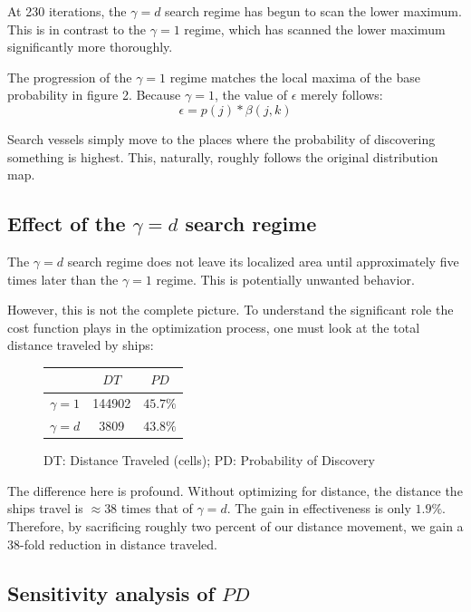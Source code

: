 \documentclass[a4paper]{article}
\begin{document}
At 230 iterations, the $\gamma=d$ search regime has begun to scan the lower maximum. This is in contrast to the $\gamma=1$ regime, which has scanned the lower maximum significantly more thoroughly.

The progression of the $\gamma=1$ regime matches the local maxima of the base probability in figure 2. Because $\gamma=1$, the value of $\epsilon$ merely follows: $$\epsilon = p(j)*\beta(j,k)$$

Search vessels simply move to the places where the probability of discovering something is highest. This, naturally, roughly follows the original distribution map.

\subsection{Effect of the $\gamma=d$ search regime}

The $\gamma=d$ search regime does not leave its localized area until approximately five times later than the $\gamma=1$ regime. This is potentially unwanted behavior. 

However, this is not the complete picture. To understand the significant role the cost function plays in the optimization process, one must look at the total distance traveled by ships:

\begin{figure}[H]\begin{center}
\begin{tabular}{|c|c|c|}
\hline & $DT$ & $PD$\\\hline\hline
$\gamma=1$ & 144902 & $45.7\%$\\\hline
$\gamma=d$ & 3809 & $43.8\%$\\\hline
\end{tabular}
\caption{DT: Distance Traveled (cells); PD: Probability of Discovery}
\end{center}\end{figure}

The difference here is profound. Without optimizing for distance, the distance the ships travel is $\approx 38$ times that of $\gamma=d$. The gain in effectiveness is only $1.9\%$. Therefore, by sacrificing roughly two percent of our distance movement, we gain a 38-fold reduction in distance traveled.

\subsection{Sensitivity analysis of $PD$}
\end{document}
